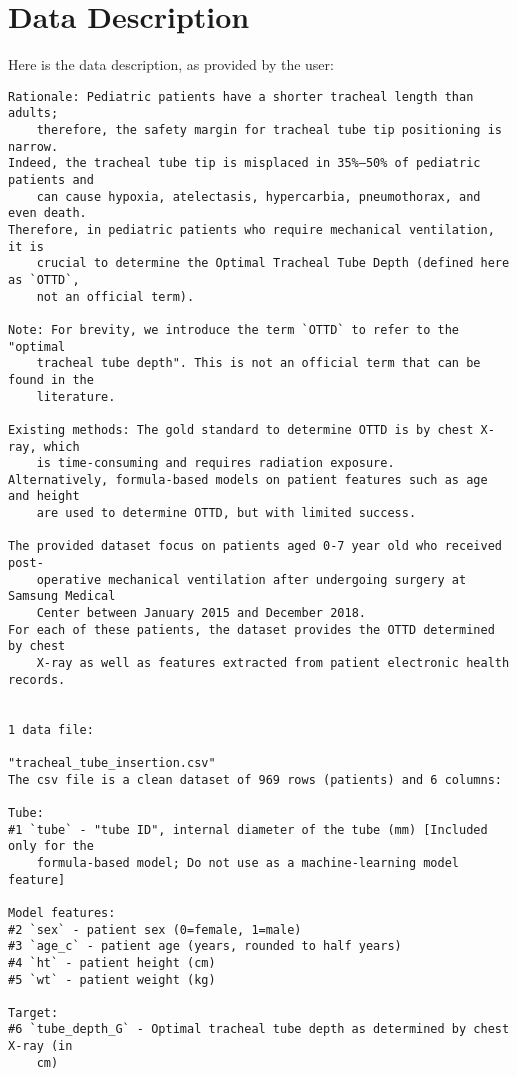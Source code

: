 \documentclass[11pt]{article}
\begin{document}
\section{Data Description} \label{sec:data_description} Here is the data description, as provided by the user:

\begin{Verbatim}[tabsize=4]
Rationale: Pediatric patients have a shorter tracheal length than adults;
	therefore, the safety margin for tracheal tube tip positioning is narrow.
Indeed, the tracheal tube tip is misplaced in 35%–50% of pediatric patients and
	can cause hypoxia, atelectasis, hypercarbia, pneumothorax, and even death.
Therefore, in pediatric patients who require mechanical ventilation, it is
	crucial to determine the Optimal Tracheal Tube Depth (defined here as `OTTD`,
	not an official term).

Note: For brevity, we introduce the term `OTTD` to refer to the "optimal
	tracheal tube depth". This is not an official term that can be found in the
	literature.

Existing methods: The gold standard to determine OTTD is by chest X-ray, which
	is time-consuming and requires radiation exposure.
Alternatively, formula-based models on patient features such as age and height
	are used to determine OTTD, but with limited success.

The provided dataset focus on patients aged 0-7 year old who received post-
	operative mechanical ventilation after undergoing surgery at Samsung Medical
	Center between January 2015 and December 2018.
For each of these patients, the dataset provides the OTTD determined by chest
	X-ray as well as features extracted from patient electronic health records.


1 data file:

"tracheal_tube_insertion.csv"
The csv file is a clean dataset of 969 rows (patients) and 6 columns:

Tube:
#1 `tube` - "tube ID", internal diameter of the tube (mm) [Included only for the
	formula-based model; Do not use as a machine-learning model feature]

Model features:
#2 `sex` - patient sex (0=female, 1=male)
#3 `age_c` - patient age (years, rounded to half years)
#4 `ht` - patient height (cm)
#5 `wt` - patient weight (kg)

Target:
#6 `tube_depth_G` - Optimal tracheal tube depth as determined by chest X-ray (in
	cm)



\end{Verbatim}
\end{document}
